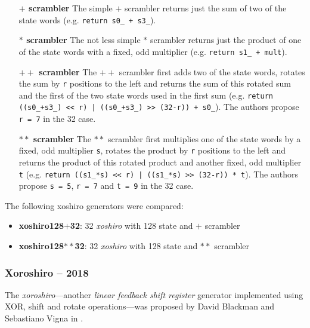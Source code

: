     \begin{itemize}
        \itemsep0em
        \item[\textbf{$\mathbf{+}$ scrambler}]  The simple $\mathbf{+}$ scrambler returns just the sum of two of the state words (e.g. \lstinline|return s0_ + s3_|).
        \item[\textbf{$\mathbf{*}$ scrambler}]  The not less simple $\mathbf{*}$ scrambler returns just the product of one of the state words with a fixed, odd multiplier (e.g. \lstinline|return s1_ + mult|).
        \item[\textbf{$\mathbf{++}$ scrambler}] The $\mathbf{++}$ scrambler first adds two of the state words, rotates the sum by \lstinline|r| positions to the left and returns the sum of this rotated sum and the first of the two state words used in the first sum (e.g. \lstinline{return ((s0_+s3_) << r) | ((s0_+s3_) >> (32-r)) + s0_}). The authors propose \lstinline|r = 7| in the \SI{32}{\bit} case.
        \item[\textbf{$\mathbf{**}$ scrambler}] The $\mathbf{**}$ scrambler first multiplies one of the state words by a fixed, odd multiplier \lstinline|s|, rotates the product by \lstinline|r| positions to the left and returns the product of this rotated product and another fixed, odd multiplier \lstinline|t| (e.g. \lstinline{return ((s1_*s) << r) | ((s1_*s) >> (32-r)) * t}). The authors propose \lstinline|s = 5|, \lstinline|r = 7| and \lstinline|t = 9| in the \SI{32}{\bit} case.
    \end{itemize}

    The following xoshiro generators were compared:
    \begin{itemize}
        \itemsep0em
        \item \textbf{xoshiro128$\mathbf{+}$32}: \SI{32}{\bit} \emph{xoshiro} with \SI{128}{\bit} state and $\mathbf{+}$ scrambler
        \item \textbf{xoshiro128$\mathbf{**}$32}: \SI{32}{\bit} \emph{xoshiro} with \SI{128}{\bit} state and $\mathbf{**}$ scrambler
    \end{itemize}

\subsubsection[Xoroshiro -- 2018]{Xoroshiro -- 2018} \label{subsubsec:xoroshiro}

    The \emph{xoroshiro}---another \emph{linear feedback shift register} generator implemented using XOR, shift and rotate operations---was proposed by David Blackman and Sebastiano Vigna in \cite{Blackman:2018}.

